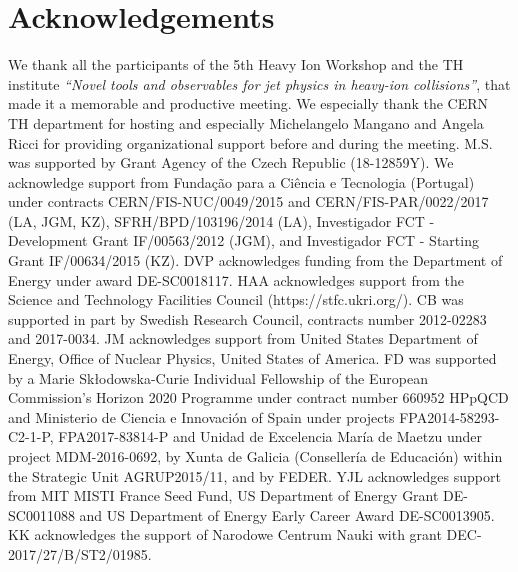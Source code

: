 \documentclass[10pt,a4paper]{article}
\begin{document}
\section*{Acknowledgements} 
We thank all the participants of the 5th Heavy Ion Workshop and the TH institute {\sl ``Novel tools and observables for jet physics in heavy-ion collisions''}, that made it a memorable and productive meeting.
We especially thank the CERN TH department for hosting and especially Michelangelo Mangano and Angela Ricci for providing organizational support before and during the meeting.
M.S. was supported by Grant Agency of the Czech Republic (18-12859Y).
We acknowledge support from  Funda{\c c}{\~ a}o para a Ci{\^ e}ncia e Tecnologia (Portugal) under contracts CERN/FIS-NUC/0049/2015 and CERN/FIS-PAR/0022/2017 (LA, JGM, KZ), SFRH/BPD/103196/2014 (LA),  Investigador FCT - Development Grant IF/00563/2012 (JGM), and Investigador FCT - Starting Grant IF/00634/2015 (KZ).
DVP acknowledges funding from the Department of Energy under award DE-SC0018117.
HAA acknowledges support from the Science and Technology Facilities Council (https://stfc.ukri.org/).
CB was supported in part by Swedish Research Council, contracts number 2012-02283 and 2017-0034.
JM acknowledges support from United States Department of Energy, Office of Nuclear Physics, United States of America.
FD was supported by a Marie Sk\l{}odowska-Curie Individual Fellowship of the European Commission's Horizon 2020 Programme under contract number 660952 HPpQCD and Ministerio de Ciencia e Innovaci{\' o}n of Spain under projects FPA2014-58293-C2-1-P, FPA2017-83814-P and Unidad de Excelencia Mar{\' i}a de Maetzu under project MDM-2016-0692, by Xunta de Galicia (Conseller{\' i}a de Educaci{\' o}n) within the Strategic Unit AGRUP2015/11, and by FEDER.
YJL acknowledges support from MIT MISTI France Seed Fund, US Department of Energy Grant DE-SC0011088 and US Department of Energy Early Career Award DE-SC0013905.
KK acknowledges the support of Narodowe Centrum Nauki with grant DEC-2017/27/B/ST2/01985.

\appendix





\end{document}
